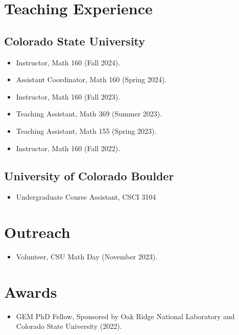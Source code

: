 \documentclass{cv_style}
\begin{document}
	\section{Teaching Experience}
	\subsection{Colorado State University}
	\begin{itemize}
		\item Instructor, Math 160 (Fall 2024).
		\item Assistant Coordinator, Math 160 (Spring 2024).
		\item Instructor, Math 160 (Fall 2023).
		\item Teaching Assistant, Math 369 (Summer 2023).
		\item Teaching Assistant, Math 155 (Spring 2023).
		\item Instructor, Math 160 (Fall 2022).
	\end{itemize}
	\subsection{University of Colorado Boulder}
		\begin{itemize}
			\item Undergraduate Course Assistant, CSCI 3104
		\end{itemize}
		
	
	
		
	\section{Outreach}
		\begin{itemize}
			\item Volunteer, CSU Math Day (November 2023).
		\end{itemize}
		
	\section{Awards}
		\begin{itemize}
			\item GEM PhD Fellow, Sponsored by Oak Ridge National Laboratory and Colorado State University (2022).
		\end{itemize}
\end{document}
